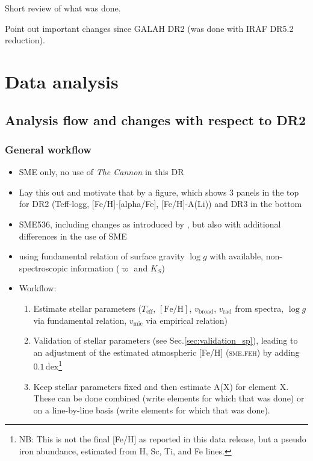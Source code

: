 \documentclass[fleqn,usenatbib,useAMS]{mnras}
\newcommand{\teff}{$T_\mathrm{eff}$\xspace}
\newcommand{\logg}{$\log g$\xspace}
\newcommand{\feh}{$\mathrm{[Fe/H]}$\xspace}
\newcommand{\vmic}{$v_\mathrm{mic}$\xspace}
\newcommand{\vbroad}{$v_\mathrm{broad}$\xspace}
\newcommand{\vrad}{$v_\mathrm{rad}$\xspace}
\begin{document}
Short review of what was done.

Point out important changes since GALAH DR2 (was done with IRAF DR5.2 reduction).

\section{Data analysis} \label{sec:analysis}

\subsection{Analysis flow and changes with respect to DR2} \label{sec:analysis_flow}

\subsubsection{General workflow}

\begin{itemize}
\item SME only, no use of \textit{The Cannon} in this DR
\item Lay this out and motivate that by a figure, which shows 3 panels in the top for DR2 (Teff-logg, [Fe/H]-[alpha/Fe], [Fe/H]-A(Li)) and DR3 in the bottom
\item SME536, including changes as introduced by \citet{Piskunov2017}, but also with additional differences in the use of SME
\item using fundamental relation of surface gravity $\log g$ with available, non-spectroscopic information ($\varpi$ and $K_S$)
\item Workflow: 
\begin{enumerate}
	\item Estimate stellar parameters (\teff, \feh, \vbroad, \vrad from spectra, \logg via fundamental relation, \vmic via empirical relation)
	\item Validation of stellar parameters (see Sec.\ref{sec:validation_sp}), leading to an adjustment of the estimated atmospheric [Fe/H] (\textsc{sme.feh}) by adding $0.1\,\mathrm{dex}$\footnote{NB: This is not the final [Fe/H] as reported in this data release, but a pseudo iron abundance, estimated from H, Sc, Ti, and Fe lines.}
	\item Keep stellar parameters fixed and then estimate A(X) for element X. These can be done combined (write elements for which that was done) or on a line-by-line basis (write elements for which that was done).
\end{enumerate}
\end{itemize}
\end{document}
